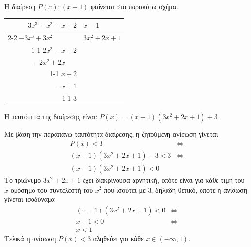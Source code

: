 \begin{alist}
\item Η διαίρεση $P(x) : (x-1)$ φαίνεται στο παρακάτω σχήμα.
\begin{center}
\begin{tabular}{r|l}
$3x^3 - x^2 - x + 2$ & $x - 1$ \\ \cline{2-2}
$-3x^3 + 3x^2 \phantom{{} - x + 2}$ & $3x^2 + 2x + 1$ \\ \cline{1-1}
$2x^2 - x + 2$ & \\
$-2x^2 + 2x \phantom{{} + 2}$ & \\ \cline{1-1}
$x + 2$ & \\
$-x + 1$ & \\ \cline{1-1}
$3$ &
\end{tabular}
\end{center}
Η ταυτότητα της διαίρεσης είναι: $P(x) = (x-1)(3x^2 + 2x + 1) + 3$.
\item Με βάση την παραπάνω ταυτότητα διαίρεσης, η ζητούμενη ανίσωση γίνεται
\begin{align*}
P(x) < 3 &\Leftrightarrow \\
(x-1)(3x^2 + 2x + 1) + 3 < 3 &\Leftrightarrow \\
(x-1)(3x^2 + 2x + 1) < 0
\end{align*}
Το τριώνυμο $3x^2 + 2x + 1$ έχει διακρίνουσα αρνητική, οπότε είναι για κάθε τιμή του $x$ ομόσημο του συντελεστή του $x^2$ που ισούται με 3, δηλαδή θετικό, οπότε η ανίσωση γίνεται ισοδύναμα
\begin{align*}
(x-1)(3x^2 + 2x + 1) < 0 &\Leftrightarrow \\
x-1 < 0 &\Leftrightarrow \\
x < 1
\end{align*}
Τελικά η ανίσωση $P(x) < 3$ αληθεύει για κάθε $x \in (-\infty, 1)$.
\end{alist}

